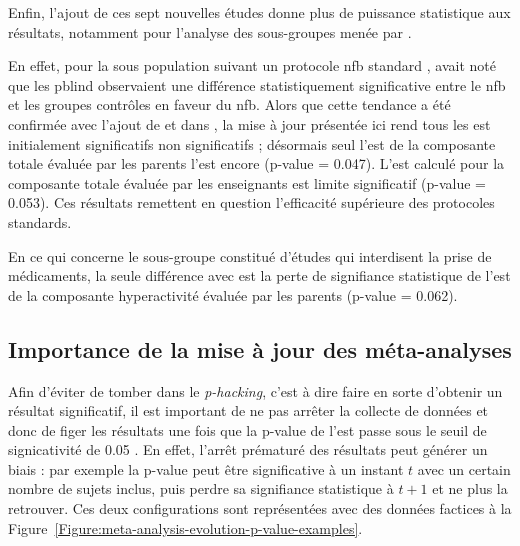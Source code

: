 Enfin, l'ajout de ces sept nouvelles études donne plus de puissance statistique aux résultats, notamment pour l'analyse des sous-groupes menée par \citet{Cortese2016}.

En effet, pour la sous population suivant un protocole \gls{nfb} standard \citep{Arns2014}, \citet{Cortese2016} avait noté que les \gls{pblind} observaient
une différence statistiquement significative entre le \gls{nfb} et les groupes contrôles en faveur du \gls{nfb}. Alors que cette tendance a été confirmée avec l'ajout 
de \citet{Baumeister2016} et \citet{Strehl2017} dans \citet{Bussalb2019clinical}, la mise à jour présentée ici rend tous les \gls{est} initialement significatifs 
non significatifs ; désormais seul l'\gls{est} de la composante totale évaluée par les parents l'est encore (p-value = 0.047). 
L'\gls{est} calculé pour la composante totale évaluée par les enseignants est limite significatif (p-value = 0.053). Ces résultats remettent en question l'efficacité
supérieure des protocoles standards.

En ce qui concerne le sous-groupe constitué d'études qui interdisent la prise de médicaments, la seule différence avec \citep{Cortese2016} est la perte de   
signifiance statistique de l'\gls{est} de la composante hyperactivité évaluée par les parents (p-value = 0.062).

\subsection{Importance de la mise à jour des méta-analyses} \label{need_to_update_meta_analysis}

Afin d'éviter de tomber dans le \textit{p-hacking}, c'est à dire faire en sorte d'obtenir un résultat significatif, il est important de ne pas arrêter la collecte de données 
et donc de figer les résultats une fois que la p-value de l'\gls{est} passe sous le seuil de signicativité de 0.05 \citep{Head2015, Coffman2015}. En effet, l'arrêt prématuré des résultats peut
générer un biais : par exemple la p-value peut être significative à un instant $t$ avec un certain nombre de sujets inclus, puis perdre sa signifiance statistique à
$t + 1$ et ne plus la retrouver. Ces deux configurations sont représentées avec des données factices à la Figure~\ref{Figure:meta-analysis-evolution-p-value-examples}.

